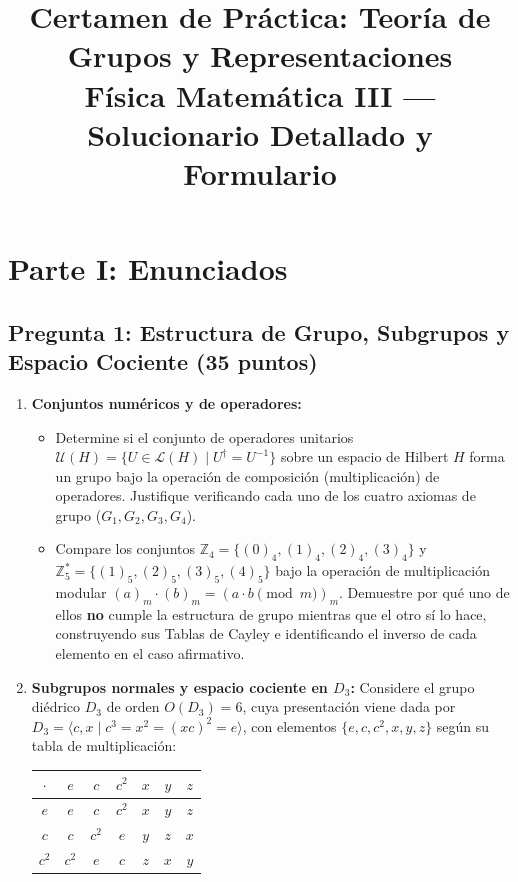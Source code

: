 \documentclass[11pt, a4paper]{article}
\title{\textbf{Certamen de Práctica: Teoría de Grupos y Representaciones}\\ \large Física Matemática III — Solucionario Detallado y Formulario}
\author{}
\date{}
\begin{document}
\maketitle

\section*{Parte I: Enunciados}

\subsection*{Pregunta 1: Estructura de Grupo, Subgrupos y Espacio Cociente (35 puntos)}
\begin{enumerate}
    \item \textbf{Conjuntos numéricos y de operadores:}
    \begin{itemize}
        \item Determine si el conjunto de operadores unitarios $\mathcal{U}(H) = \{U \in \mathcal{L}(H) \mid U^\dagger = U^{-1}\}$ sobre un espacio de Hilbert $H$ forma un grupo bajo la operación de composición (multiplicación) de operadores. Justifique verificando cada uno de los cuatro axiomas de grupo ($G_1, G_2, G_3, G_4$).
        \item Compare los conjuntos $\mathbb{Z}_4 = \{(0)_4, (1)_4, (2)_4, (3)_4\}$ y $\mathbb{Z}_5^* = \{(1)_5, (2)_5, (3)_5, (4)_5\}$ bajo la operación de multiplicación modular $(a)_m \cdot (b)_m = (a \cdot b \pmod m)_m$. Demuestre por qué uno de ellos \textbf{no} cumple la estructura de grupo mientras que el otro sí lo hace, construyendo sus Tablas de Cayley e identificando el inverso de cada elemento en el caso afirmativo.
    \end{itemize}
    \item \textbf{Subgrupos normales y espacio cociente en $D_3$:}
    Considere el grupo diédrico $D_3$ de orden $O(D_3) = 6$, cuya presentación viene dada por $D_3 = \langle c, x \mid c^3 = x^2 = (xc)^2 = e \rangle$, con elementos $\{e, c, c^2, x, y, z\}$ según su tabla de multiplicación:
    \begin{center}
    \begin{tabular}{c|cccccc}
    $\cdot$ & $e$ & $c$ & $c^2$ & $x$ & $y$ & $z$ \\
    \hline
    $e$ & $e$ & $c$ & $c^2$ & $x$ & $y$ & $z$ \\
    $c$ & $c$ & $c^2$ & $e$ & $y$ & $z$ & $x$ \\
    $c^2$ & $c^2$ & $e$ & $c$ & $z$ & $x$ & $y$ \\

\end{tabular}
\end{center}
\end{enumerate}
\end{document}
